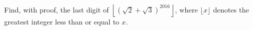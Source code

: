 Find, with proof, the last digit of $\left\lfloor\left(\sqrt2+\sqrt3\right)^{2016}\right\rfloor$, where $\lfloor x\rfloor$ denotes the greatest integer less than or equal to $x$.
